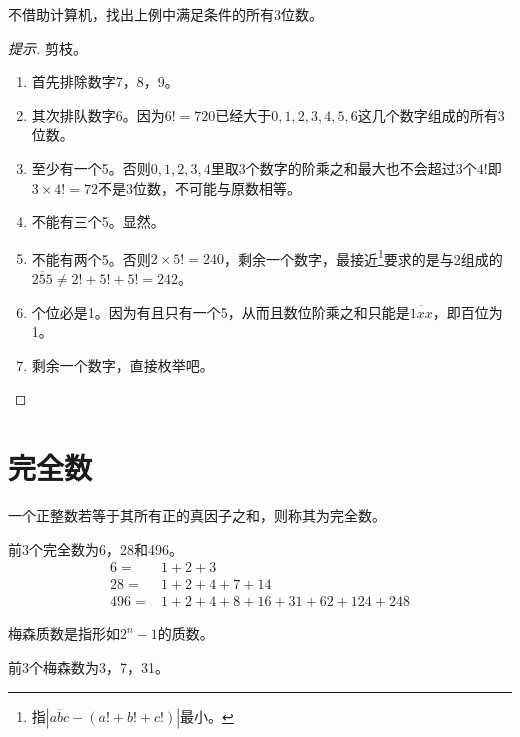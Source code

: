 \begin{question}[莫斯科，1940]
  不借助计算机，找出上例中满足条件的所有3位数。
\end{question}
\begin{proof}[提示]
  剪枝。
  \begin{enumerate}
  \item 首先排除数字7，8，9。

  \item 其次排队数字6。因为$6!=720$已经大于$0,1,2,3,4,5,6$这几个数字组成的所有3位数。

  \item 至少有一个5。否则$0,1,2,3,4$里取3个数字的阶乘之和最大也不会超过3个$4!$即$3\times 4!=72$不是3位数，不可能与原数相等。

  \item 不能有三个5。显然。

  \item 不能有两个5。否则$2\times 5!=240$，剩余一个数字，最接近\footnote{指$|\overline{abc}-(a!+b!+c!)|$最小。}要求的是与2组成的$\overline{255}\ne 2!+5!+5!=242$。

  \item 个位必是1。因为有且只有一个5，从而且数位阶乘之和只能是$\overline{1xx}$，即百位为1。
    
  \item 剩余一个数字，直接枚举吧。\qedhere
  \end{enumerate}
\end{proof}


\section{完全数}
\label{sec:perfect-number}

\begin{definition}
  一个正整数若等于其所有正的真因子之和，则称其为完全数。
\end{definition}
前3个完全数为6，28和496。
\begin{align*}
  6   ={} & 1 + 2 + 3\\
  28  ={} & 1 + 2 + 4 + 7 + 14\\
  496 ={} & 1 + 2 + 4 + 8 + 16 + 31 + 62 + 124 + 248
\end{align*}

\begin{definition}
  梅森质数是指形如$2^n - 1$的质数。
\end{definition}

前3个梅森数为3，7，31。

